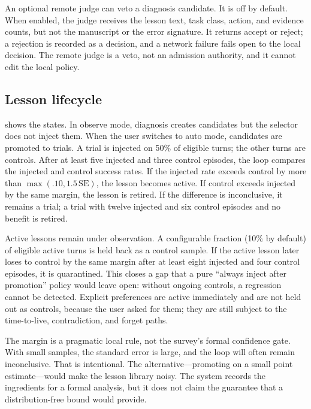 An optional remote judge can veto a diagnosis candidate. It is off by default. When enabled, the judge receives the lesson text, task class, action, and evidence counts, but not the manuscript or the error signature. It returns accept or reject; a rejection is recorded as a decision, and a network failure fails open to the local decision. The remote judge is a veto, not an admission authority, and it cannot edit the local policy.

\subsection{Lesson lifecycle}
\label{sec:lifecycle}
 shows the states. In observe mode, diagnosis creates candidates but the selector does not inject them. When the user switches to auto mode, candidates are promoted to trials. A trial is injected on 50\% of eligible turns; the other turns are controls. After at least five injected and three control episodes, the loop compares the injected and control success rates. If the injected rate exceeds control by more than $\max(.10,1.5\,\mathrm{SE})$, the lesson becomes active. If control exceeds injected by the same margin, the lesson is retired. If the difference is inconclusive, it remains a trial; a trial with twelve injected and six control episodes and no benefit is retired.

Active lessons remain under observation. A configurable fraction (10\% by default) of eligible active turns is held back as a control sample. If the active lesson later loses to control by the same margin after at least eight injected and four control episodes, it is quarantined. This closes a gap that a pure ``always inject after promotion'' policy would leave open: without ongoing controls, a regression cannot be detected. Explicit preferences are active immediately and are not held out as controls, because the user asked for them; they are still subject to the time-to-live, contradiction, and forget paths.

The margin is a pragmatic local rule, not the survey's formal confidence gate. With small samples, the standard error is large, and the loop will often remain inconclusive. That is intentional. The alternative---promoting on a small point estimate---would make the lesson library noisy. The system records the ingredients for a formal analysis, but it does not claim the guarantee that a distribution-free bound would provide.




